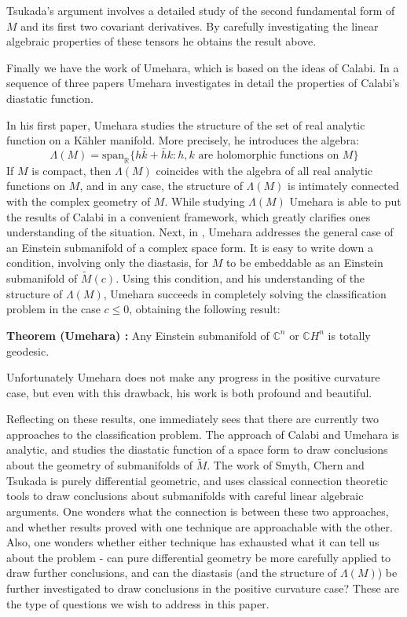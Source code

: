 \documentclass[11pt]{amsart}
\theoremstyle{definition}
\def \C{ \mathbb{C} }
\def \CH{ \mathbb{C}H }
\def \Mamb{ \mathcal{M} }
\def \Mamb{ \tilde{M} }
\begin{document}
Tsukada's argument involves a detailed study of the second fundamental form of $M$ and its first two covariant derivatives.  By carefully investigating the linear algebraic properties of these tensors he obtains the result above.

Finally we have the work of Umehara, which is based on the ideas of Calabi.  In a sequence of three papers \cite{Um1} \cite{Um2} Umehara investigates in detail the properties of Calabi's diastatic function.  

In his first paper, Umehara studies the structure of the set of real analytic function on a K\"{a}hler manifold.  More precisely, he introduces the algebra:
%
$$ \Lambda( M ) = \text{span}_{\mathbb{R}} \{ h \bar{k} + \bar{h} k : h, k \text{ are holomorphic functions on } M \} $$
%
If $M$ is compact, then $\Lambda(M)$ coincides with the algebra of all real analytic functions on $M$, and in any case, the structure of $\Lambda(M)$ is intimately connected with the complex geometry of $M$.  While studying $\Lambda(M)$ Umehara is able to put the results of Calabi in a convenient framework, which greatly clarifies ones understanding of the situation.  Next, in \cite{Um2}, Umehara addresses the general case of an Einstein submanifold of a complex space form.  It is easy to write down a condition, involving only the diastasis, for $M$ to be embeddable as an Einstein submanifold of $\Mamb(c)$.  Using this condition, and his understanding of the structure of $\Lambda(M)$, Umehara succeeds in completely solving the classification problem in the case $c \leq 0$, obtaining the following result:

{\bf Theorem (Umehara) :} Any Einstein submanifold of $\C^n$ or $\CH^n$ is totally geodesic.

Unfortunately Umehara does not make any progress in the positive curvature case, but even with this drawback, his work is both profound and beautiful.

Reflecting on these results, one immediately sees that there are currently two approaches to the classification problem.  The approach of Calabi and Umehara is analytic, and studies the diastatic function of a space form to draw conclusions about the geometry of submanifolds of $\Mamb$.  The work of Smyth, Chern and Tsukada is purely differential geometric, and uses classical connection theoretic tools to draw conclusions about submanifolds with careful linear algebraic arguments.  One wonders what the connection is between these two approaches, and whether results proved with one technique are approachable with the other.  Also, one wonders whether either technique has exhausted what it can tell us about the problem - can pure differential geometry be more carefully applied to draw further conclusions, and can the diastasis (and the structure of $\Lambda(M)$) be further investigated to draw conclusions in the positive curvature case?  These are the type of questions we wish to address in this paper.
\end{document}
